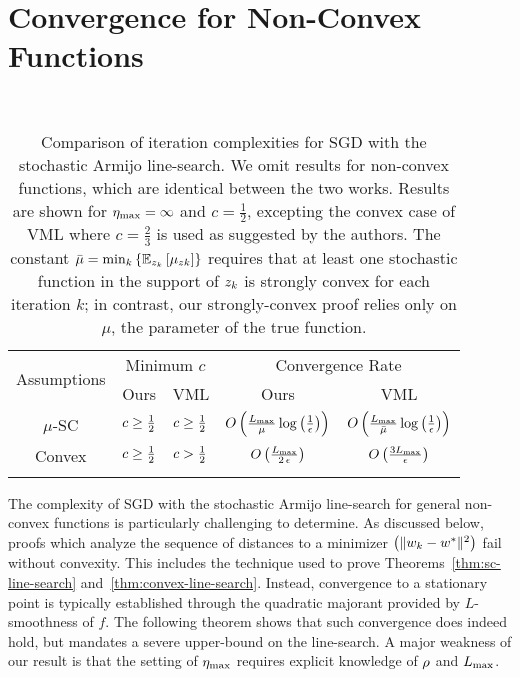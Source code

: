 \section{Convergence for Non-Convex Functions}~\label{sec:ls-nc}

\begin{table}[t]
    \centering
    \begin{tabular}{c l l c c }\toprule
        \multirow{2}{*}{Assumptions} & \multicolumn{2}{c}{Minimum \( c \)} & \multicolumn{2}{c}{Convergence Rate}\\%
        \cmidrule(lr){2-3} \cmidrule(lr){4-5}
                 & \multicolumn{1}{c}{Ours} & \multicolumn{1}{c}{VML}%
                 & \multicolumn{1}{c}{Ours} & \multicolumn{1}{c}{VML}\\ \midrule
    \( \mu \)-SC & \( c \geq \frac 1 2 \)%
                 & \( c \geq \frac 1 2 \)%
                 & \( O\left(\frac{L_{\text{max}}}{\mu} \log\left(\frac{1}{\epsilon}\right)\right) \)%
                 & \( O\left(\frac{L_{\text{max}}}{\bar \mu} \log\left(\frac{1}{\epsilon}\right)\right) \) \\ \addlinespace
    Convex       & \( c \geq \frac 1 2 \)%
                 & \( c > \frac 1 2 \)%
                 & \( O\left(\frac{L_{\text{max}}}{2 \, \epsilon}\right) \)%
                 & \( O\left(\frac{3 L_{\text{max}}}{\epsilon}\right) \)\\ \addlinespace 
        \end{tabular}
        \caption[Comparison of iteration complexities for stochastic gradient descent with the stochastic Armijo line-search.]%
        {Comparison of iteration complexities for \ac{SGD} with the stochastic Armijo line-search.
         We omit results for non-convex functions, which are identical between the two works.
         Results are shown for \( \eta_{\text{max}} = \infty \) and \( c = \frac{1}{2} \), excepting the convex case of VML \citep{vaswani2019painless} where \( c = \frac{2}{3} \) is used as suggested by the authors.
         The constant \( \bar \mu = \min_k \left\{\mathbb{E}_{z_{k}} \left[\mu_{zk}\right] \right\} \) requires that at least one stochastic function in the support of \( z_{k} \) is strongly convex for each iteration \( k \);
         in contrast, our strongly-convex proof relies only on \( \mu \), the parameter of the true function.  }%
    \label{table:ls-comparison}
\end{table}

The complexity of \ac{SGD} with the stochastic Armijo line-search for general non-convex functions is particularly challenging to determine.
As discussed below, proofs which analyze the sequence of distances to a minimizer \( \left(\|w_k - w^*\|^2\right) \) fail without convexity.
This includes the technique used to prove Theorems~\ref{thm:sc-line-search} and~\ref{thm:convex-line-search}.
Instead, convergence to a stationary point is typically established through the quadratic majorant provided by \( L \)-smoothness of \( f \).
The following theorem shows that such convergence does indeed hold, but mandates a severe upper-bound on the line-search.
A major weakness of our result is that the setting of \( \eta_{\text{max}} \) requires explicit knowledge of \( \rho \) and \( L_{\text{max}} \). 

